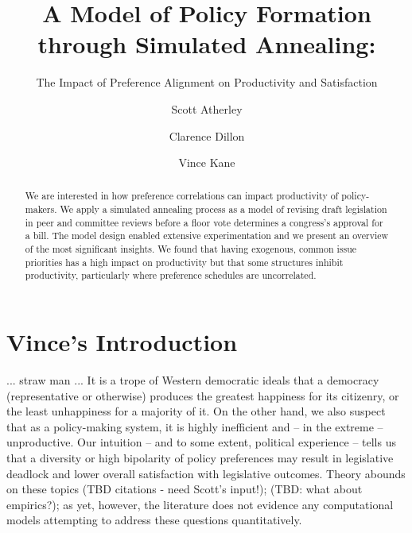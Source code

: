 \documentclass[pdftex,12pt]{llncs}
\begin{document}
\title{A Model of Policy Formation through Simulated Annealing:}
\subtitle{The Impact of Preference Alignment on Productivity and Satisfaction}
\author{Scott Atherley \and Clarence Dillon \and Vince Kane}
\maketitle

%
%

\begin{abstract}
 We are interested in how preference correlations can impact productivity of policy-makers. 
 We apply a simulated annealing process as a model of revising draft legislation in peer and committee reviews before a floor vote determines a congress's approval for a bill.
 The model design enabled extensive experimentation and we present an overview of the most significant insights. We found that having exogenous, common issue priorities has a high impact on productivity but that some structures inhibit productivity, particularly where preference schedules are uncorrelated.
\end{abstract}

\section{Vince's Introduction}
... straw man ...
It is a trope of Western democratic ideals that a democracy (representative or otherwise) produces the greatest happiness for its citizenry, or the least unhappiness for a majority of it.
On the other hand, we also suspect that as a policy-making system, it is highly inefficient and -- in the extreme -- unproductive.
Our intuition -- and to some extent, political experience -- tells us that a diversity or high bipolarity of policy preferences may result in legislative deadlock and lower overall satisfaction with legislative outcomes.
Theory abounds on these topics (TBD citations - need Scott's input!); (TBD: what about empirics?); as yet, however, the literature does not evidence any computational models attempting to address these questions quantitatively.
\end{document}
